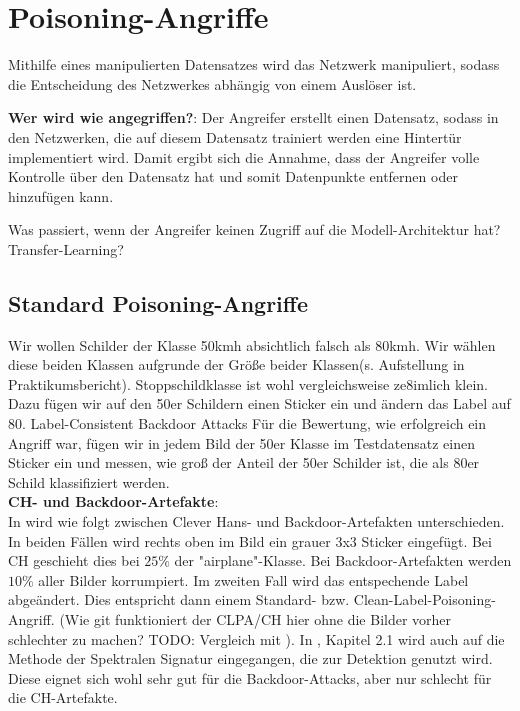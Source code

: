 \documentclass[twoside, 11pt,a4paper]{article}
\numberwithin{equation}{section}
\begin{document}
	
	\section{Poisoning-Angriffe} \label{chapter_poisoningattacks}
	Mithilfe eines manipulierten Datensatzes wird das Netzwerk manipuliert, sodass die Entscheidung des Netzwerkes abhängig von einem Auslöser ist.
	
	\noindent \textbf{Wer wird wie angegriffen?}: Der Angreifer erstellt einen Datensatz, sodass in den Netzwerken, die auf diesem Datensatz trainiert werden eine Hintertür implementiert wird. Damit ergibt sich die Annahme, dass der Angreifer volle Kontrolle über den Datensatz hat und somit Datenpunkte entfernen oder hinzufügen kann.
	
	Was passiert, wenn der Angreifer keinen Zugriff auf die Modell-Architektur hat? Transfer-Learning? 
	
	\subsection{Standard Poisoning-Angriffe}
	Wir wollen Schilder der Klasse 50kmh absichtlich falsch als 80kmh. Wir wählen diese beiden Klassen aufgrunde der Größe beider Klassen(s. Aufstellung in Praktikumsbericht). Stoppschildklasse ist wohl vergleichsweise ze8imlich klein.\\
	
	Dazu fügen wir auf den 50er Schildern einen Sticker ein und ändern das Label auf 80.
	Label-Consistent
	Backdoor Attacks
	Für die Bewertung, wie erfolgreich ein Angriff war, fügen wir in jedem Bild der 50er Klasse im Testdatensatz einen Sticker ein und messen, wie groß der Anteil der 50er Schilder ist, die als 80er Schild klassifiziert werden.\\
	
	\noindent \textbf{CH- und Backdoor-Artefakte}:\\
	In \cite{imagenet_unhansed_v2} wird wie folgt zwischen Clever Hans- und Backdoor-Artefakten unterschieden. In beiden Fällen wird rechts oben im Bild ein grauer 3x3 Sticker eingefügt.
	Bei CH geschieht dies bei $25 \%$ der "airplane"-Klasse. Bei Backdoor-Artefakten werden $10 \%$ aller Bilder korrumpiert. Im zweiten Fall wird das entspechende Label abgeändert. Dies entspricht dann einem Standard- bzw. Clean-Label-Poisoning-Angriff. (Wie git funktioniert der CLPA/CH hier ohne die Bilder vorher schlechter zu machen? TODO: Vergleich mit \cite{labelconsistent}). In \cite{imagenet_unhansed_v2}, Kapitel 2.1 wird auch auf die Methode der Spektralen Signatur \cite{spectral_signatures} eingegangen, die zur Detektion genutzt wird. Diese eignet sich wohl sehr gut für die Backdoor-Attacks, aber nur schlecht für die CH-Artefakte.
	
\end{document}
